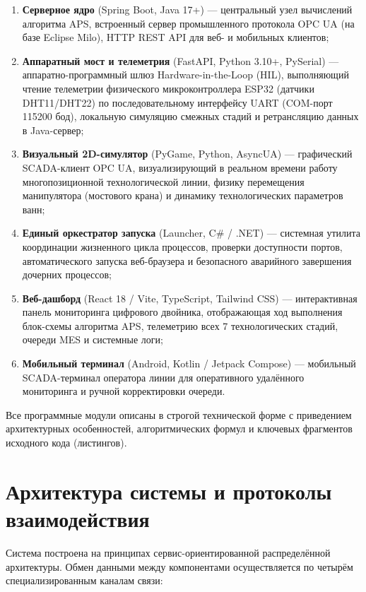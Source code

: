 \documentclass[14pt, a4paper]{extarticle}
\begin{document}
\begin{enumerate}
    \item \textbf{Серверное ядро} (Spring Boot, Java 17+) --- центральный узел вычислений алгоритма APS, встроенный сервер промышленного протокола OPC UA (на базе Eclipse Milo), HTTP REST API для веб- и мобильных клиентов;
    \item \textbf{Аппаратный мост и телеметрия} (FastAPI, Python 3.10+, PySerial) --- аппаратно-программный шлюз Hardware-in-the-Loop (HIL), выполняющий чтение телеметрии физического микроконтроллера ESP32 (датчики DHT11/DHT22) по последовательному интерфейсу UART (COM-порт 115200 бод), локальную симуляцию смежных стадий и ретрансляцию данных в Java-сервер;
    \item \textbf{Визуальный 2D-симулятор} (PyGame, Python, AsyncUA) --- графический SCADA-клиент OPC UA, визуализирующий в реальном времени работу многопозиционной технологической линии, физику перемещения манипулятора (мостового крана) и динамику технологических параметров ванн;
    \item \textbf{Единый оркестратор запуска} (Launcher, C\# / .NET) --- системная утилита координации жизненного цикла процессов, проверки доступности портов, автоматического запуска веб-браузера и безопасного аварийного завершения дочерних процессов;
    \item \textbf{Веб-дашборд} (React 18 / Vite, TypeScript, Tailwind CSS) --- интерактивная панель мониторинга цифрового двойника, отображающая ход выполнения блок-схемы алгоритма APS, телеметрию всех 7 технологических стадий, очереди MES и системные логи;
    \item \textbf{Мобильный терминал} (Android, Kotlin / Jetpack Compose) --- мобильный SCADA-терминал оператора линии для оперативного удалённого мониторинга и ручной корректировки очереди.
\end{enumerate}

Все программные модули описаны в строгой технической форме с приведением архитектурных особенностей, алгоритмических формул и ключевых фрагментов исходного кода (листингов).

\section{Архитектура системы и протоколы взаимодействия}

Система построена на принципах сервис-ориентированной распределённой архитектуры. Обмен данными между компонентами осуществляется по четырём специализированным каналам связи:
\end{document}
